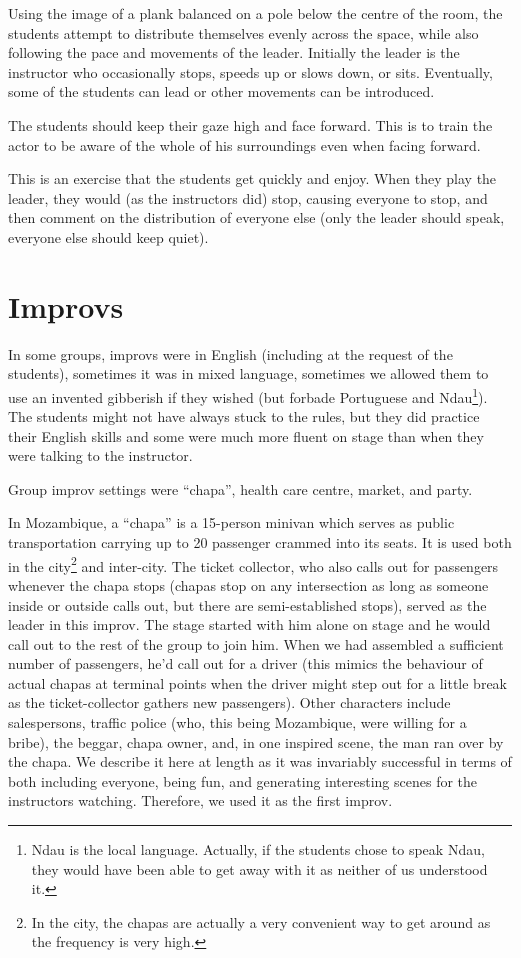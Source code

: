 \documentclass[article,twocolumn,twoside]{memoir}
\begin{document}
Using the image of a plank balanced on a pole below the centre of the room, the
students attempt to distribute themselves evenly across the space, while also
following the pace and movements of the leader. Initially the leader is the
instructor who occasionally stops, speeds up or slows down, or sits.
Eventually, some of the students can lead or other movements can be introduced.

The students should keep their gaze high and face forward. This is to train the
actor to be aware of the whole of his surroundings even when facing forward.

This is an exercise that the students get quickly and enjoy. When they play the
leader, they would (as the instructors did) stop, causing everyone to stop, and
then comment on the distribution of everyone else (only the leader should
speak, everyone else should keep quiet).

\section{Improvs}

In some groups, improvs were in English (including at the request of the
students), sometimes it was in mixed language, sometimes we allowed them to use
an invented gibberish if they wished (but forbade Portuguese and
Ndau\footnote{Ndau is the local language. Actually, if the students chose to
speak Ndau, they would have been able to get away with it as neither of us
understood it.}). The students might not have always stuck to the rules, but
they did practice their English skills and some were much more fluent on stage
than when they were talking to the instructor.

Group improv settings were ``chapa'', health care centre, market, and party.

In Mozambique, a ``chapa'' is a 15-person minivan which serves as public
transportation carrying up to 20 passenger crammed into its seats. It is used
both in the city\footnote{In the city, the chapas are actually a very
convenient way to get around as the frequency is very high.} and inter-city.
The ticket collector, who also calls out for passengers whenever the chapa
stops (chapas stop on any intersection as long as someone inside or outside
calls out, but there are semi-established stops), served as the leader in this
improv. The stage started with him alone on stage and he would call out to the
rest of the group to join him. When we had assembled a sufficient number of
passengers, he'd call out for a driver (this mimics the behaviour of actual
chapas at terminal points when the driver might step out for a little break as
the ticket-collector gathers new passengers). Other characters include
salespersons, traffic police (who, this being Mozambique, were willing for a
bribe), the beggar, chapa owner, and, in one inspired scene, the man ran over
by the chapa. We describe it here at length as it was invariably successful in
terms of both including everyone, being fun, and generating interesting scenes
for the instructors watching. Therefore, we used it as the first improv.
\end{document}
